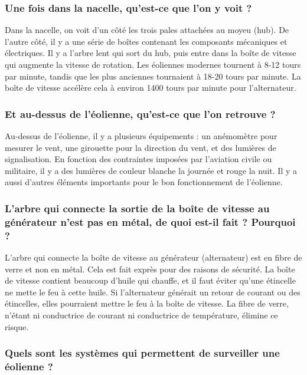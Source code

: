 \subsubsection{Une fois dans la nacelle, qu'est-ce que l'on y voit ?}

Dans la nacelle, on voit d'un côté les trois pales attachées au moyeu (hub). De l'autre côté, il y a une série de boîtes contenant les composants mécaniques et électriques. Il y a l'arbre lent qui sort du hub, puis entre dans la boîte de vitesse qui augmente la vitesse de rotation. Les éoliennes modernes tournent à 8-12 tours par minute, tandis que les plus anciennes tournaient à 18-20 tours par minute. La boîte de vitesse accélère cela à environ 1400 tours par minute pour l'alternateur.

\subsubsection{Et au-dessus de l'éolienne, qu'est-ce que l'on retrouve ?}

Au-dessus de l'éolienne, il y a plusieurs équipements : un anémomètre pour mesurer le vent, une girouette pour la direction du vent, et des lumières de signalisation. En fonction des contraintes imposées par l'aviation civile ou militaire, il y a des lumières de couleur blanche la journée et rouge la nuit. Il y a aussi d'autres éléments importants pour le bon fonctionnement de l'éolienne.

\subsubsection{L'arbre qui connecte la sortie de la boîte de vitesse au générateur n'est pas en métal, de quoi est-il fait ? Pourquoi ?}

L'arbre qui connecte la boîte de vitesse au générateur (alternateur) est en fibre de verre et non en métal. Cela est fait exprès pour des raisons de sécurité. La boîte de vitesse contient beaucoup d'huile qui chauffe, et il faut éviter qu'une étincelle ne mette le feu à cette huile. Si l'alternateur générait un retour de courant ou des étincelles, elles pourraient mettre le feu à la boîte de vitesse. La fibre de verre, n'étant ni conductrice de courant ni conductrice de température, élimine ce risque.

\subsubsection{Quels sont les systèmes qui permettent de surveiller une éolienne ?}

